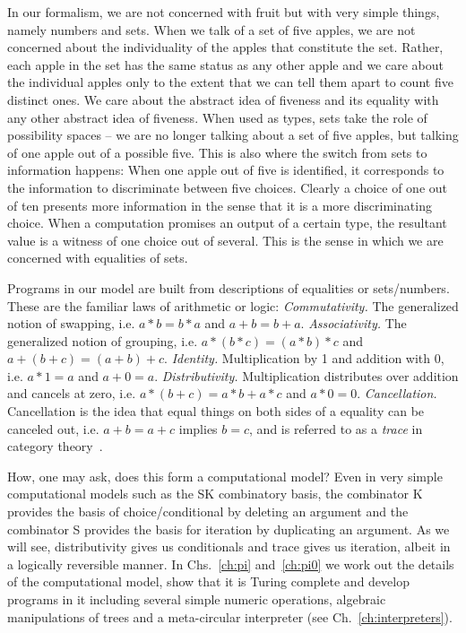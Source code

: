 \documentclass{article}
\begin{document}
In our formalism, we are not concerned with fruit but with very simple
things, namely numbers and sets. When we talk of a set of five apples,
we are not concerned about the individuality of the apples that
constitute the set. Rather, each apple in the set has the same status
as any other apple and we care about the individual apples only to the
extent that we can tell them apart to count five distinct ones. We
care about the abstract idea of fiveness and its equality with any
other abstract idea of fiveness.  When used as types, sets take the
role of possibility spaces -- we are no longer talking about a set of
five apples, but talking of one apple out of a possible five. This is
also where the switch from sets to information happens: When one apple
out of five is identified, it corresponds to the information to
discriminate between five choices. Clearly a choice of one out of ten
presents more information in the sense that it is a more
discriminating choice. When a computation promises an output of a
certain type, the resultant value is a witness of one choice out of
several. This is the sense in which we are concerned with equalities
of sets.

Programs in our model are built from descriptions of equalities or
sets/numbers. These are the familiar laws of arithmetic or logic:
\emph{Commutativity.} The generalized notion of swapping,
i.e. $a*b=b*a$ and $a+b=b+a$.  
\emph{Associativity.} The
generalized notion of grouping, i.e. $a*(b*c)=(a*b)*c$ and
$a+(b+c)=(a+b)+c$.
\emph{Identity.} Multiplication by 1 and addition with 0,
  i.e. $a*1=a$ and $a+0=a$.
\emph{Distributivity.} Multiplication distributes over addition
  and cancels at zero, i.e. $a*(b+c)=a*b+a*c$ and $a*0=0$.
\emph{Cancellation.} Cancellation is the idea that equal things
  on both sides of a equality can be canceled out, i.e. $a+b=a+c$
  implies $b=c$, and is referred to as a \emph{trace} in category
  theory~\cite{joyal1996traced}.

How, one may ask, does this form a computational model? Even in very
simple computational models such as the SK combinatory basis, the
combinator K provides the basis of choice/conditional by deleting an
argument and the combinator S provides the basis for iteration by
duplicating an argument. As we will see, distributivity gives us
conditionals and trace gives us iteration, albeit in a logically
reversible manner.  In Chs.~\ref{ch:pi} and~\ref{ch:pi0} we work out
the details of the computational model, show that it is Turing
complete and develop programs in it including several simple numeric
operations, algebraic manipulations of trees and a meta-circular
interpreter (see Ch.~\ref{ch:interpreters}).
\end{document}
